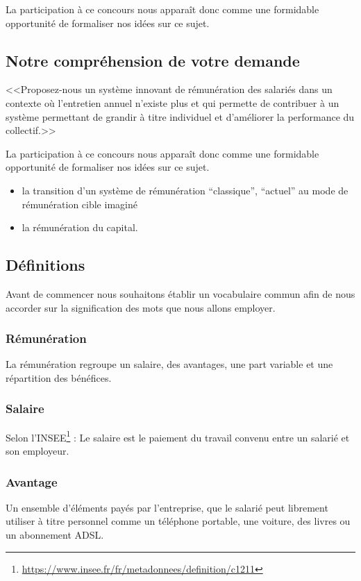 \documentclass[12pt]{article}
\begin{document}
La participation à ce concours nous apparaît donc comme une formidable opportunité de formaliser nos idées sur ce sujet.

\subsection{Notre compréhension de votre demande}
 <<Proposez-nous un système innovant de rémunération des salariés dans un contexte où l’entretien annuel n’existe plus et qui permette de contribuer à un système permettant de grandir à titre individuel et d’améliorer la performance du collectif.>>

La participation à ce concours nous apparaît donc comme une formidable opportunité de formaliser nos idées sur ce sujet.
\begin{itemize}
  \item la transition  d’un système de rémunération “classique”, “actuel” au mode de rémunération cible imaginé
  \item la rémunération du capital.
\end{itemize}

\subsection{Définitions}
 Avant de commencer nous souhaitons établir un vocabulaire commun afin de nous accorder sur la signification des mots que nous allons employer.

\subsubsection{Rémunération} 
 La rémunération regroupe un salaire, des avantages, une part variable et une répartition des bénéfices.

\subsubsection{Salaire}
 Selon l’INSEE\footnote{\url{https://www.insee.fr/fr/metadonnees/definition/c1211}} : Le salaire est le paiement du travail convenu entre un salarié et son employeur. 

\subsubsection{Avantage}
 Un ensemble d’éléments payés par l’entreprise, que le salarié peut librement utiliser à titre personnel comme un téléphone portable, une voiture, des livres ou un abonnement ADSL.
\end{document}
